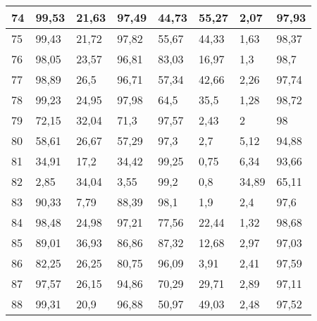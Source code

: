\begin{longtable}[c]{|l|l|l|l|l|l|l|l|}
74              & 99,53        & 21,63        & 97,49       & 44,73         & 55,27         & 2,07          & 97,93         \\ \hline
75              & 99,43        & 21,72        & 97,82       & 55,67         & 44,33         & 1,63          & 98,37         \\ \hline
76              & 98,05        & 23,57        & 96,81       & 83,03         & 16,97         & 1,3           & 98,7          \\ \hline
77              & 98,89        & 26,5         & 96,71       & 57,34         & 42,66         & 2,26          & 97,74         \\ \hline
78              & 99,23        & 24,95        & 97,98       & 64,5          & 35,5          & 1,28          & 98,72         \\ \hline
79              & 72,15        & 32,04        & 71,3        & 97,57         & 2,43          & 2             & 98            \\ \hline
80              & 58,61        & 26,67        & 57,29       & 97,3          & 2,7           & 5,12          & 94,88         \\ \hline
81              & 34,91        & 17,2         & 34,42       & 99,25         & 0,75          & 6,34          & 93,66         \\ \hline
82              & 2,85         & 34,04        & 3,55        & 99,2          & 0,8           & 34,89         & 65,11         \\ \hline
83              & 90,33        & 7,79         & 88,39       & 98,1          & 1,9           & 2,4           & 97,6          \\ \hline
84              & 98,48        & 24,98        & 97,21       & 77,56         & 22,44         & 1,32          & 98,68         \\ \hline
85              & 89,01        & 36,93        & 86,86       & 87,32         & 12,68         & 2,97          & 97,03         \\ \hline
86              & 82,25        & 26,25        & 80,75       & 96,09         & 3,91          & 2,41          & 97,59         \\ \hline
87              & 97,57        & 26,15        & 94,86       & 70,29         & 29,71         & 2,89          & 97,11         \\ \hline
88              & 99,31        & 20,9         & 96,88       & 50,97         & 49,03         & 2,48          & 97,52         \\ \hline

\end{longtable}
